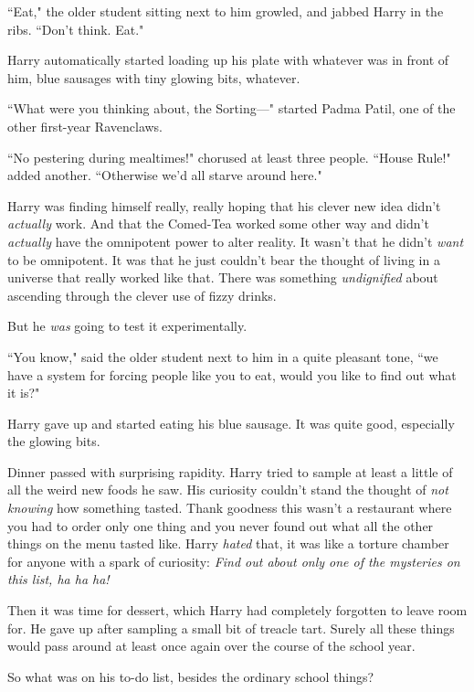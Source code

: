 ``Eat," the older student sitting next to him growled, and jabbed Harry in the ribs. ``Don't think. Eat."

Harry automatically started loading up his plate with whatever was in front of him, blue sausages with tiny glowing bits, whatever.

``What were you thinking about, the Sorting—" started Padma Patil, one of the other first-year Ravenclaws.

``No pestering during mealtimes!" chorused at least three people. ``House Rule!" added another. ``Otherwise we'd all starve around here."

Harry was finding himself really, really hoping that his clever new idea didn't \emph{actually} work. And that the Comed-Tea worked some other way and didn't \emph{actually} have the omnipotent power to alter reality. It wasn't that he didn't \emph{want} to be omnipotent. It was that he just couldn't bear the thought of living in a universe that really worked like that. There was something \emph{undignified} about ascending through the clever use of fizzy drinks.

But he \emph{was} going to test it experimentally.

``You know," said the older student next to him in a quite pleasant tone, ``we have a system for forcing people like you to eat, would you like to find out what it is?"

Harry gave up and started eating his blue sausage. It was quite good, especially the glowing bits.

Dinner passed with surprising rapidity. Harry tried to sample at least a little of all the weird new foods he saw. His curiosity couldn't stand the thought of \emph{not knowing} how something tasted. Thank goodness this wasn't a restaurant where you had to order only one thing and you never found out what all the other things on the menu tasted like. Harry \emph{hated} that, it was like a torture chamber for anyone with a spark of curiosity: \emph{Find out about only one of the mysteries on this list, ha ha ha!}

Then it was time for dessert, which Harry had completely forgotten to leave room for. He gave up after sampling a small bit of treacle tart. Surely all these things would pass around at least once again over the course of the school year.

So what was on his to-do list, besides the ordinary school things?

